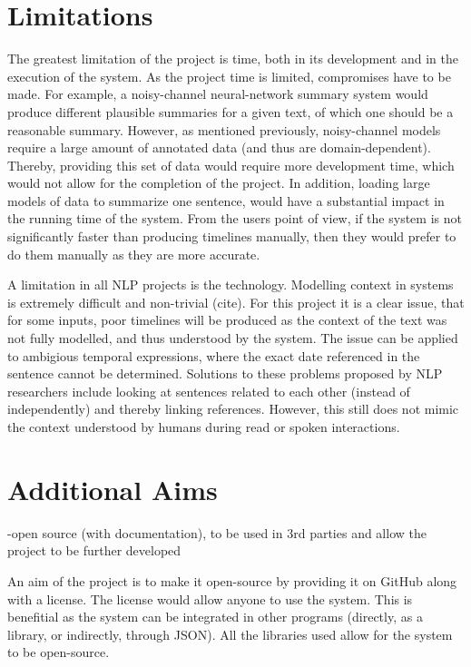 \section{Limitations}
\par The greatest limitation of the project is time, both in its development and in the execution of the system. As the project time is limited, compromises have to be made. For example, a noisy-channel neural-network summary system would produce different plausible summaries for a given text, of which one should be a reasonable summary. However, as mentioned previously, noisy-channel models require a large amount of annotated data (and thus are domain-dependent). Thereby, providing this set of data would require more development time, which would not allow for the completion of the project. In addition, loading large models of data to summarize one sentence, would have a substantial impact in the running time of the system. From the users point of view, if the system is not significantly faster than producing timelines manually, then they would prefer to do them manually as they are more accurate.

\par A limitation in all NLP projects is the technology. Modelling context in systems is extremely difficult and non-trivial (cite). For this project it is a clear issue, that for some inputs, poor timelines will be produced as the context of the text was not fully modelled, and thus understood by the system. The issue can be applied to ambigious temporal expressions, where the exact date referenced in the sentence cannot be determined. Solutions to these problems proposed by NLP researchers include looking at sentences related to each other (instead of independently) and thereby linking references. However, this still does not mimic the context understood by humans during read or spoken interactions.

\section{Additional Aims} 
-open source (with documentation), to be used in 3rd parties and allow the project to be further developed
\par An aim of the project is to make it open-source by providing it on GitHub along with a license. The license would allow anyone to use the system. This is benefitial as the system can be integrated in other programs (directly, as a library, or indirectly, through JSON). All the libraries used allow for the system to be open-source.


